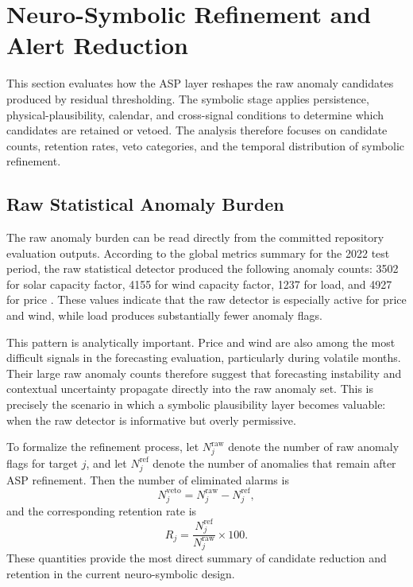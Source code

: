 \section{Neuro-Symbolic Refinement and Alert Reduction}
\label{sec:ns_refinement_false_alarm_reduction}

This section evaluates how the ASP layer reshapes the raw anomaly candidates
produced by residual thresholding. The symbolic stage applies persistence,
physical-plausibility, calendar, and cross-signal conditions to determine which
candidates are retained or vetoed. The analysis therefore focuses on candidate
counts, retention rates, veto categories, and the temporal distribution of symbolic
refinement.


\subsection{Raw Statistical Anomaly Burden}

The raw anomaly burden can be read directly from the committed repository evaluation outputs. According to the global metrics summary for the 2022 test period, the raw statistical detector produced the following anomaly counts: 3502 for solar capacity factor, 4155 for wind capacity factor, 1237 for load, and 4927 for price \cite{repo_thesis_grid_anomaly}. These values indicate that the raw detector is especially active for price and wind, while load produces substantially fewer anomaly flags.

This pattern is analytically important. Price and wind are also among the most difficult signals in the forecasting evaluation, particularly during volatile months. Their large raw anomaly counts therefore suggest that forecasting instability and contextual uncertainty propagate directly into the raw anomaly set. This is precisely the scenario in which a symbolic plausibility layer becomes valuable: when the raw detector is informative but overly permissive.

To formalize the refinement process, let $N_j^{\mathrm{raw}}$ denote the number of raw anomaly flags for target $j$, and let $N_j^{\mathrm{ref}}$ denote the number of anomalies that remain after ASP refinement. Then the number of eliminated alarms is
\begin{equation}
	N_j^{\mathrm{veto}} = N_j^{\mathrm{raw}} - N_j^{\mathrm{ref}},
	\label{eq:veto_count_ch72}
\end{equation}
and the corresponding retention rate is
\begin{equation}
	R_j = \frac{N_j^{\mathrm{ref}}}{N_j^{\mathrm{raw}}}\times 100.
	\label{eq:retention_rate_ch72}
\end{equation}
These quantities provide the most direct summary of candidate reduction and
retention in the current neuro-symbolic design.


